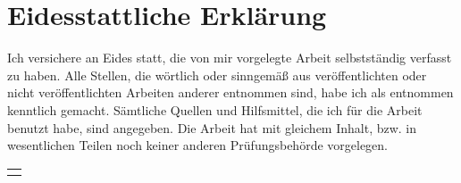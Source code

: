 \section*{Eidesstattliche Erklärung}
Ich versichere an Eides statt, die von mir vorgelegte Arbeit selbstständig verfasst zu haben. Alle Stellen, die wörtlich oder sinngemäß aus veröffentlichten oder nicht veröffentlichten Arbeiten anderer entnommen sind, habe ich als entnommen kenntlich gemacht. Sämtliche Quellen und Hilfsmittel, die ich für die Arbeit benutzt habe, sind angegeben. Die Arbeit hat mit gleichem Inhalt, bzw. in wesentlichen Teilen noch keiner anderen Prüfungsbehörde vorgelegen.

\vspace{5cm}

\begin{table}[H]
\begin{tabular}{l}
\cline{1-1}
\rule{0pt}{4ex}   
\hspace{8cm}
\end{tabular}
\end{table}
